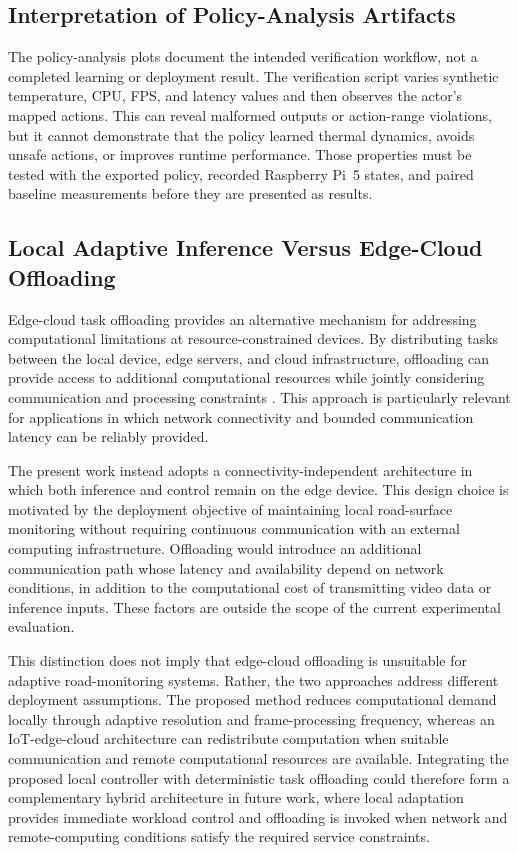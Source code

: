 \documentclass{ieeeaccess}
\begin{document}
\subsection{Interpretation of Policy-Analysis Artifacts}

The policy-analysis plots document the intended verification workflow, not a
completed learning or deployment result. The verification script varies
synthetic temperature, CPU, FPS, and latency values and then observes the
actor's mapped actions. This can reveal malformed outputs or action-range
violations, but it cannot demonstrate that the policy learned thermal
dynamics, avoids unsafe actions, or improves runtime performance. Those
properties must be tested with the exported policy, recorded Raspberry Pi~5
states, and paired baseline measurements before they are presented as results.

\subsection{Local Adaptive Inference Versus Edge-Cloud Offloading}

Edge-cloud task offloading provides an alternative mechanism for addressing
computational limitations at resource-constrained devices. By distributing
tasks between the local device, edge servers, and cloud infrastructure,
offloading can provide access to additional computational resources while
jointly considering communication and processing constraints
\cite{b25}. This approach is particularly relevant for applications in which
network connectivity and bounded communication latency can be reliably
provided.

The present work instead adopts a connectivity-independent architecture in
which both inference and control remain on the edge device. This design choice
is motivated by the deployment objective of maintaining local road-surface
monitoring without requiring continuous communication with an external
computing infrastructure. Offloading would introduce an additional
communication path whose latency and availability depend on network
conditions, in addition to the computational cost of transmitting video data
or inference inputs. These factors are outside the scope of the current
experimental evaluation.

This distinction does not imply that edge-cloud offloading is unsuitable for
adaptive road-monitoring systems. Rather, the two approaches address
different deployment assumptions. The proposed method reduces computational
demand locally through adaptive resolution and frame-processing frequency,
whereas an IoT-edge-cloud architecture can redistribute computation when
suitable communication and remote computational resources are available.
Integrating the proposed local controller with deterministic task offloading
could therefore form a complementary hybrid architecture in future work,
where local adaptation provides immediate workload control and offloading is
invoked when network and remote-computing conditions satisfy the required
service constraints.
\end{document}
